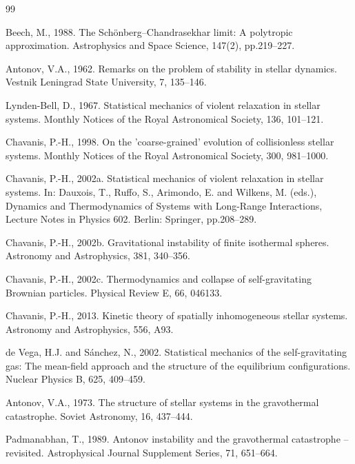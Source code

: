 \documentclass[12pt,a4paper]{article}
\numberwithin{equation}{section}
\begin{document}
\begin{thebibliography}{99}
\item Beech, M., 1988. The Schönberg–Chandrasekhar limit: A polytropic approximation. Astrophysics and Space Science, 147(2), pp.219–227.

\item Antonov, V.A., 1962. Remarks on the problem of stability in stellar dynamics. Vestnik Leningrad State University, 7, 135–146.

\item Lynden-Bell, D., 1967. Statistical mechanics of violent relaxation in stellar systems. Monthly Notices of the Royal Astronomical Society, 136, 101–121.

\item Chavanis, P.-H., 1998. On the 'coarse-grained' evolution of collisionless stellar systems. Monthly Notices of the Royal Astronomical Society, 300, 981–1000.

\item Chavanis, P.-H., 2002a. Statistical mechanics of violent relaxation in stellar systems. In: Dauxois, T., Ruffo, S., Arimondo, E. and Wilkens, M. (eds.), Dynamics and Thermodynamics of Systems with Long-Range Interactions, Lecture Notes in Physics 602. Berlin: Springer, pp.208–289.

\item Chavanis, P.-H., 2002b. Gravitational instability of finite isothermal spheres. Astronomy and Astrophysics, 381, 340–356.

\item Chavanis, P.-H., 2002c. Thermodynamics and collapse of self-gravitating Brownian particles. Physical Review E, 66, 046133.

\item Chavanis, P.-H., 2013. Kinetic theory of spatially inhomogeneous stellar systems. Astronomy and Astrophysics, 556, A93.

\item de Vega, H.J. and Sánchez, N., 2002. Statistical mechanics of the self-gravitating gas: The mean-field approach and the structure of the equilibrium configurations. Nuclear Physics B, 625, 409–459.

\item Antonov, V.A., 1973. The structure of stellar systems in the gravothermal catastrophe. Soviet Astronomy, 16, 437–444.

\item Padmanabhan, T., 1989. Antonov instability and the gravothermal catastrophe – revisited. Astrophysical Journal Supplement Series, 71, 651–664.


\end{thebibliography}
\end{document}
